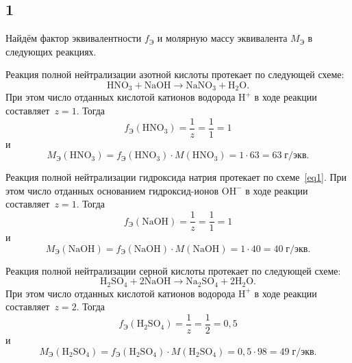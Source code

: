 \subsection{1}

Найдём фактор эквивалентности $f_\text{Э}$ и молярную массу эквивалента $M_\text{Э}$ в следующих реакциях.
\begin{Enumerate}
	\item Реакция полной нейтрализации азотной кислоты протекает по следующей схеме:
	\begin{equation}\label{eq1}
	\mathrm{HNO_3}+\mathrm{NaOH}\longrightarrow\mathrm{NaNO_3}+\mathrm{H_2O}.
	\end{equation}
	При этом число отданных кислотой катионов водорода $\mathrm{H^+}$ в ходе реакции составляет~$z=1$. Тогда
	\[
	f_\text{Э}(\mathrm{HNO_3})=\frac{1}{z}=\frac{1}{1}=1
	\]
	и
	\[
	M_\text{Э}(\mathrm{HNO_3})=f_\text{Э}(\mathrm{HNO_3})\cdot M(\mathrm{HNO_3})=1\cdot63=63\;\text{г/экв}.
	\]
	
	\item Реакция полной нейтрализации гидроксида натрия протекает по схеме~\eqref{eq1}.
	При этом число отданных основанием гидроксид-ионов $\mathrm{OH^-}$ в ходе реакции составляет~$z=1$. Тогда
	\[
	f_\text{Э}(\mathrm{NaOH})=\frac{1}{z}=\frac{1}{1}=1
	\]
	и
	\[
	M_\text{Э}(\mathrm{NaOH})=f_\text{Э}(\mathrm{NaOH})\cdot M(\mathrm{NaOH})=1\cdot40=40\;\text{г/экв}.
	\]
	
	\item Реакция полной нейтрализации серной кислоты протекает по следующей схеме:
	\[
	\mathrm{H_2SO_4}+2\mathrm{NaOH}\longrightarrow\mathrm{Na_2SO_4}+2\mathrm{H_2O}.
	\]
	При этом число отданных кислотой катионов водорода $\mathrm{H^+}$ в ходе реакции составляет~$z=2$. Тогда
	\[
	f_\text{Э}(\mathrm{H_2SO_4})=\frac{1}{z}=\frac{1}{2}=0{,}5
	\]
	и
	\[
	M_\text{Э}(\mathrm{H_2SO_4})=f_\text{Э}(\mathrm{H_2SO_4})\cdot M(\mathrm{H_2SO_4})=0{,}5\cdot98=49\;\text{г/экв}.
	\]
\end{Enumerate}